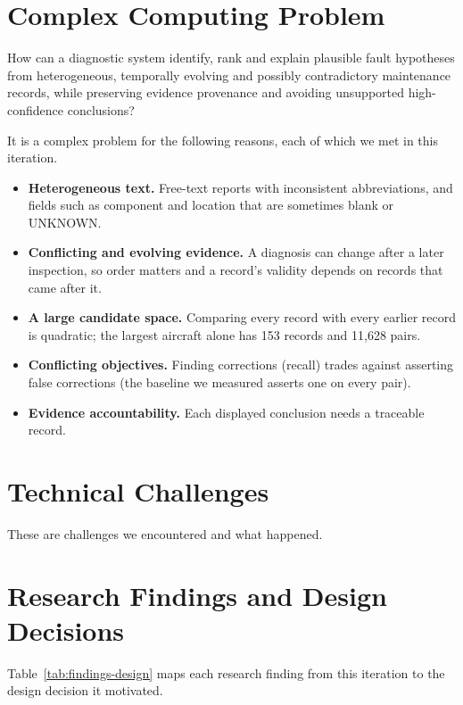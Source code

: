 \section{Complex Computing Problem}

How can a diagnostic system identify, rank and explain plausible fault hypotheses from heterogeneous, temporally evolving and possibly contradictory maintenance records, while preserving evidence provenance and avoiding unsupported high-confidence conclusions?

It is a complex problem for the following reasons, each of which we met in this iteration.

\begin{itemize}
\item \textbf{Heterogeneous text.} Free-text reports with inconsistent abbreviations, and fields such as component and location that are sometimes blank or UNKNOWN.
\item \textbf{Conflicting and evolving evidence.} A diagnosis can change after a later inspection, so order matters and a record's validity depends on records that came after it.
\item \textbf{A large candidate space.} Comparing every record with every earlier record is quadratic; the largest aircraft alone has 153 records and 11{,}628 pairs.
\item \textbf{Conflicting objectives.} Finding corrections (recall) trades against asserting false corrections (the baseline we measured asserts one on every pair).
\item \textbf{Evidence accountability.} Each displayed conclusion needs a traceable record.
\end{itemize}

\section{Technical Challenges}

These are challenges we encountered and what happened.



\section{Research Findings and Design Decisions}

Table~\ref{tab:findings-design} maps each research finding from this iteration to the design decision it motivated.


